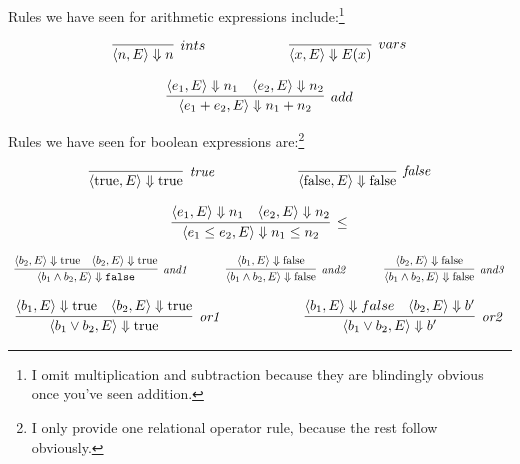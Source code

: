 \documentclass[11pt]{article}
\begin{document}
\noindent Rules we have seen for arithmetic expressions include:\footnote{I omit multiplication and subtraction because they are blindingly obvious once you've seen addition.}

\[
\begin{array}{llr}
\infer[ints]{\langle n, E \rangle \Downarrow n}{}
&~~~~~~~~~~~~&
\infer[vars]{\langle x, E\rangle \Downarrow E(x)} {}
\end{array}
\]

\[
\infer[add]{\langle e_1 + e_2, E \rangle \Downarrow n_1 + n_2}{\langle e_1, E\rangle \Downarrow
  n_1& \langle e_2, E \rangle \Downarrow n_2}
\]



\noindent Rules we have seen for boolean expressions are:\footnote{I only provide one relational operator rule, because the rest follow obviously.}

\[
\begin{array}{llr}
\infer[$\textit{true}$]{\langle \mbox{true}, E \rangle \Downarrow \mbox{true}}{}  
&~~~~~~~~~~~~&
\infer[$\textit{false}$]{\langle \mbox{false}, E \rangle \Downarrow \mbox{false}}{} 
\end{array}
\]

\[
\infer[\leq]{\langle e_1 \leq e_2, E \rangle \Downarrow n_1 \leq n_2 }{\langle e_1, E \rangle \Downarrow n_1 & \langle e_2, E \rangle \Downarrow n_2} 
\]


\[
\begin{array}{llclr}

\infer[$\textit{and1}$]{\langle b_1 \wedge b_2, E \rangle \Downarrow \mathtt{false}}{\langle b_2, E \rangle \Downarrow \mbox{true} & \langle b_2, E \rangle \Downarrow \mbox{true} }
&~~~~&
\infer[$\textit{and2}$]{\langle b_1 \wedge b_2, E \rangle \Downarrow \mbox{false}} {\langle b_1, E \rangle \Downarrow \mbox{false}}
&~~~~&
\infer[$\textit{and3}$]{\langle b_1 \wedge b_2, E \rangle \Downarrow \mbox{false}}{\langle b_2, E \rangle \Downarrow \mbox{false}} 
\end{array}
\]


\[
\begin{array}{lcr}
\infer[$\textit{or1}$]{\langle b_1 \vee b_2, E \rangle \Downarrow \mbox{true}}{\langle b_1, E \rangle \Downarrow \mbox{true} & \langle b_2, E \rangle \Downarrow \mbox{true} }
&~~~~~~~~~~~~&
\infer[$\textit{or2}$]{\langle b_1 \vee b_2, E \rangle \Downarrow b'}{\langle b_1, E \rangle \Downarrow false & \langle b_2, E \rangle \Downarrow b'} 
\end{array}
\]
\end{document}
